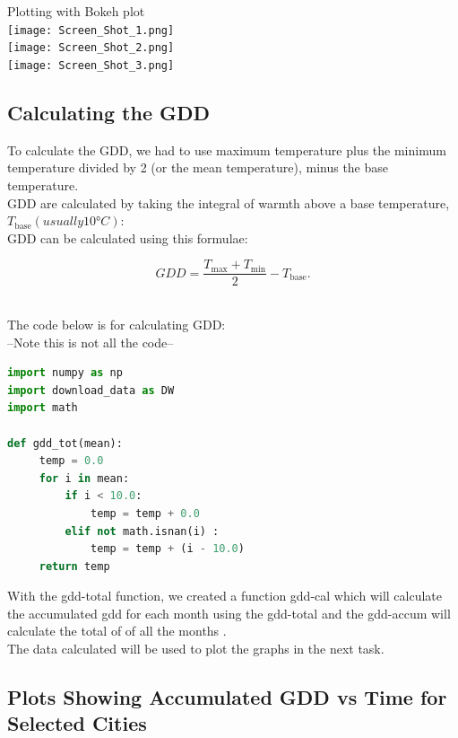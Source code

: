 Plotting with Bokeh plot\\

\texttt{[image: Screen\_Shot\_1.png]}\\
\texttt{[image: Screen\_Shot\_2.png]}\\
\texttt{[image: Screen\_Shot\_3.png]}\\



\subsection{Calculating the GDD}

To calculate the GDD, we had to use maximum temperature plus the minimum temperature divided by 2 (or the mean temperature), minus the base temperature.\\
GDD are calculated by taking the integral of warmth above a base temperature, $T_{{\mathrm  {base}}} (usually 10 °C):$\\
GDD can be calculated using this formulae:

$$GDD={\frac  {T_{{\mathrm  {max}}}+T_{{\mathrm  {min}}}}{2}}-T_{{\mathrm  {base}}}. $$\

The code below is for calculating GDD:\\
--Note this is not all the code--\\

\begin{lstlisting}[language=Python]
import numpy as np
import download_data as DW
import math

def gdd_tot(mean):
     temp = 0.0
     for i in mean:
         if i < 10.0:
             temp = temp + 0.0
         elif not math.isnan(i) :
             temp = temp + (i - 10.0)
     return temp

\end{lstlisting}

With the gdd-total function, we created a function gdd-cal which will calculate the accumulated gdd for each month using the gdd-total and the gdd-accum will calculate the total of of all the months  .\\
The data calculated will be used to plot the graphs in the next task.
  
\subsection{Plots Showing Accumulated GDD vs Time for\\ Selected Cities}

